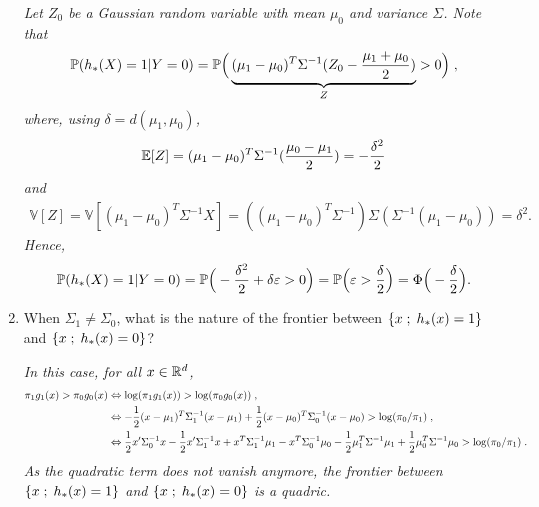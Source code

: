 \begin{enumerate}
\vspace{.2cm}

{\em
Let $Z_0$ be a Gaussian random variable with mean $\mu_0$ and variance $\Sigma$. Note that 
\begin{align*}
\mathbb{P} (h_*(X) = 1 | Y = 0) = \mathbb{P} \Big( \underbrace{(\mu_1 - \mu_0)^T \Sigma^{-1} (Z_0 - \frac{\mu_1 + \mu_0}{2})}_{Z} > 0 \Big)\;,
\end{align*}
where, using $\delta = d(\mu_{1},\mu_{0})$,   
\begin{align*}
\mathbb{E}[Z] = (\mu_1 - \mu_0)^T \Sigma^{-1} (\frac{\mu_0 - \mu_1 }{2})= - \frac{\delta^2}{2}
\end{align*}
and 
\begin{align*}
\mathbb{V}[Z] = \mathbb{V} \left[ (\mu_1 - \mu_0)^T \Sigma^{-1} X \right] = \left( (\mu_1 - \mu_0)^T \Sigma^{-1}\right) \Sigma \left( \Sigma^{-1} (\mu_1 - \mu_0)\right) = \delta^2.
\end{align*}
Hence, 
\begin{align*}
\mathbb{P} (h_*(X) = 1 | Y = 0) = \mathbb{P} \Big( - \frac{\delta^2}{2} + \delta \varepsilon >0 \Big)= \mathbb{P}\Big(\varepsilon > \frac{\delta}{2}\Big) = \Phi \Big(-\frac{\delta}{2}\Big).
\end{align*}
}
\item When $\Sigma_{1}\neq \Sigma_{0}$, what is the nature of the frontier between $\{x\;;\; h_{*}(x)=1\}$ and $\{x\;;\; h_{*}(x)=0\}$?

\vspace{.2cm}

{\em
In this case, for all $x\in\mathbb{R}^d$, 
\begin{align*}
 \pi_1 g_1(x) > \pi_0 g_0(x) &\Leftrightarrow  \log(\pi_1 g_1(x)) > \log(\pi_0 g_0(x))\;,\\
&\Leftrightarrow  -{1\over 2}(x-\mu_1)^T\Sigma_1^{-1}(x-\mu_1) + {1\over 2}(x-\mu_0)^T\Sigma_0^{-1}(x-\mu_0) > \log(\pi_0/ \pi_1)\;,\\
&\Leftrightarrow	\frac{1}{2}x'\Sigma_0^{-1}x  -\frac{1}{2}x'\Sigma_1^{-1}x +	 x^T\Sigma_1^{-1}\mu_1 - x^T\Sigma_0^{-1}\mu_0 - \frac{1}{2} \mu_1^T\Sigma^{-1}\mu_1 + \frac{1}{2} \mu_0^T\Sigma^{-1}\mu_0  > \log(\pi_0/ \pi_1)\;.
\end{align*}
As the quadratic term does not vanish anymore, the frontier between $\{x\;;\; h_{*}(x)=1\}$ and $\{x\;;\; h_{*}(x)=0\}$ is a quadric.
}
\end{enumerate}

